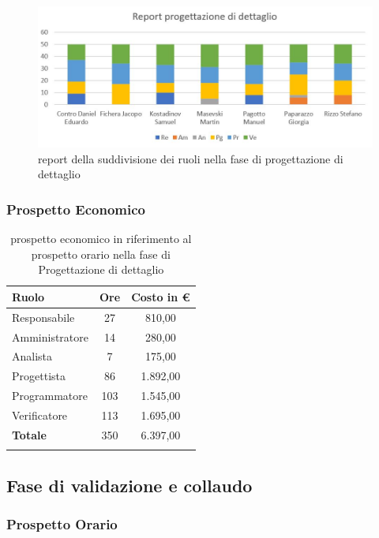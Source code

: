 \documentclass[../piano_di_progetto.tex]{subfiles}
\begin{document}
\begin{figure}[H]
\centering
\includegraphics[width=12cm]{componenti/img/report_prog_dett}
\caption{report della suddivisione dei ruoli nella fase di progettazione di dettaglio}
\end{figure}

\newpage

\subsubsection{Prospetto Economico}

\begin{center}
	\begin{longtable}{|l|c|c|}
		\hline
		\rowcolor{lightgray}
		\textbf{Ruolo} & \textbf{Ore} & \textbf{Costo in €}\\
		\hline
		Responsabile & 27 & 810,00\\
		Amministratore & 14 & 280,00\\
		Analista & 7 & 175,00\\
		Progettista & 86 & 1.892,00\\
		Programmatore & 103 & 1.545,00\\
		Verificatore & 113 & 1.695,00\\
		\textbf{Totale} & 350 & 6.397,00\\
		\hline
		\rowcolor{white}
		\caption{prospetto economico in riferimento al prospetto orario nella fase di Progettazione di dettaglio}
	\end{longtable}
\end{center}

\subsection{ Fase di validazione e collaudo}%
\label{sub:fase_valid_collaudo}
\subsubsection{Prospetto Orario}
\end{document}
